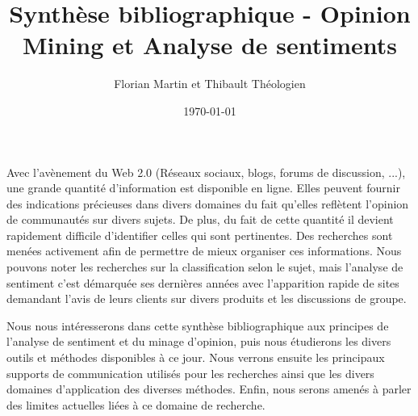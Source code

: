 \documentclass[8pt]{article}
\title{Synthèse bibliographique - Opinion Mining et Analyse de sentiments}
\author{Florian Martin et Thibault Théologien}
\date{\today}
\begin{document}
  \maketitle
  \begin{multicols}{2}
    \par Avec l’avènement du Web 2.0 (Réseaux sociaux, blogs, forums de discussion, ...), une grande quantité d’information est disponible en ligne. Elles peuvent fournir des indications précieuses dans divers domaines du fait qu’elles reflètent l’opinion de communautés sur divers sujets. De plus, du fait de cette quantité il devient rapidement difficile d’identifier celles qui sont pertinentes. Des recherches sont menées activement afin de permettre de mieux organiser ces informations. Nous pouvons noter les recherches sur la classification selon le sujet, mais l’analyse de sentiment c’est démarquée ses dernières années avec l’apparition rapide de sites demandant l’avis de leurs clients sur divers produits et les discussions de groupe.
    \par Nous nous intéresserons dans cette synthèse bibliographique aux principes de l’analyse de sentiment et du minage d’opinion, puis nous étudierons les divers outils et méthodes disponibles à ce jour. Nous verrons ensuite les principaux supports de communication utilisés pour les recherches ainsi que les divers domaines d’application des diverses méthodes. Enfin, nous serons amenés à parler des limites actuelles liées à ce domaine de recherche.

  \end{multicols}

  \newpage

  
  
  \nocite{*}
\end{document}
